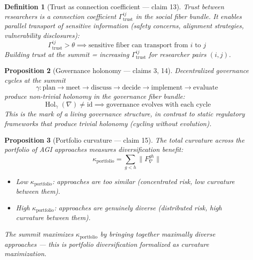 \documentclass[11pt,a4paper]{article}
\newtheorem{definition}{Definition}[section]
\newtheorem{proposition}[definition]{Proposition}
\begin{document}
\begin{definition}[Trust as connection coefficient --- claim 13]
\emph{Trust} between researchers is a connection coefficient
$\Gamma_{\text{trust}}^{ij}$ in the social fiber bundle. It enables
parallel transport of sensitive information (safety concerns, alignment
strategies, vulnerability disclosures):
\[
  \Gamma_{\text{trust}}^{ij} > \theta \implies
  \text{sensitive fiber can transport from } i \text{ to } j
\]
Building trust at the summit = increasing $\Gamma_{\text{trust}}^{ij}$
for researcher pairs $(i,j)$.
\end{definition}

\begin{proposition}[Governance holonomy --- claims 3, 14]
\label{prop:holonomy}
Decentralized governance cycles at the summit
\[
  \gamma: \text{plan} \to \text{meet} \to \text{discuss}
    \to \text{decide} \to \text{implement} \to \text{evaluate}
\]
produce non-trivial holonomy in the governance fiber bundle:
\[
  \operatorname{Hol}_\gamma(\nabla) \neq \mathrm{id}
  \implies \text{governance evolves with each cycle}
\]
This is the mark of a living governance structure, in contrast to
static regulatory frameworks that produce trivial holonomy (cycling
without evolution).
\end{proposition}

\begin{proposition}[Portfolio curvature --- claim 15]
\label{prop:portfolio}
The total curvature across the portfolio of AGI approaches measures
diversification benefit:
\[
  \kappa_{\text{portfolio}} = \sum_{g < h} \|F_\nabla^{gh}\|
\]
\begin{itemize}
  \item Low $\kappa_{\text{portfolio}}$: approaches are too similar
    (concentrated risk, low curvature between them).
  \item High $\kappa_{\text{portfolio}}$: approaches are genuinely
    diverse (distributed risk, high curvature between them).
\end{itemize}
The summit maximizes $\kappa_{\text{portfolio}}$ by bringing together
maximally diverse approaches --- this is portfolio diversification
formalized as curvature maximization.
\end{proposition}
\end{document}
